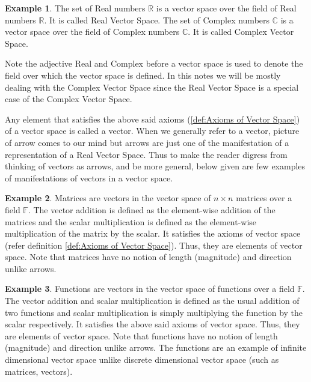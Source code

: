 \documentclass[12pt, oneside]{book}
\theoremstyle{definition}
\theoremstyle{definition}
\newtheorem{example}{Example}[section]
\theoremstyle{remark}
\begin{document}
\begin{example}
    The set of Real numbers $\mathbb{R}$ is a vector space over the field of Real numbers $\mathbb{R}$. It is called Real Vector Space.
    The set of Complex numbers $\mathbb{C}$ is a vector space over the field of Complex numbers $\mathbb{C}$. It is called Complex 
    Vector Space.
\end{example}
Note the adjective Real and Complex before a vector space is used to denote the field over which the vector space is defined.
In this notes we will be mostly dealing with the Complex Vector Space since the Real Vector Space is a special case of the Complex Vector Space.

Any element that satisfies the above said axioms (\ref{def:Axioms of Vector Space}) of a vector space is called a vector. When we generally refer to a vector, picture of arrow comes to our mind but
arrows are just one of the manifestation of a representation of a Real Vector Space. Thus to make the reader digress from thinking of vectors as arrows, and be more general, 
below given are few examples of manifestations of vectors in a vector space.

\begin{example}
    Matrices are vectors in the vector space of $n\times n$ matrices over a field $\mathbb{F}$. The vector addition is defined as the element-wise addition of the matrices and the scalar multiplication
    is defined as the element-wise multiplication of the matrix by the scalar. It satisfies the axioms of vector space (refer definition \ref{def:Axioms of Vector Space}).
    Thus, they are elements of vector space. Note that matrices have no notion of length (magnitude) and direction unlike arrows.
\end{example}

\begin{example}
    Functions are vectors in the vector space of functions over a field $\mathbb{F}$. The vector addition and scalar multiplication is defined as the usual addition of two functions
    and scalar multiplication is simply multiplying the function by the scalar respectively. It satisfies the above said axioms of vector space.
    Thus, they are elements of vector space. Note that functions have no notion of length (magnitude) and direction unlike arrows. The functions are an example of infinite 
    dimensional vector space unlike discrete dimensional vector space (such as matrices, vectors).
\end{example}
\end{document}
